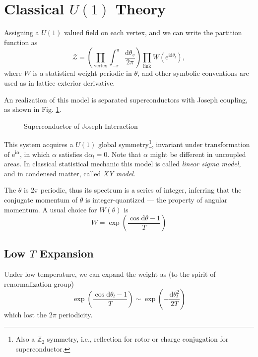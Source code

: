 
\section{Classical $U(1)$ Theory}

Assigning a $U(1)$ valued field on each vertex, and we can write the partition function as
\begin{equation}
  \mathcal{Z} = \left( \prod_{\text{vertex}} \int_{-\pi }^{\pi } \frac{\mathrm{d} \theta_{v}}{2\pi } \right) \prod_{\text{link}} W \left( \mathrm{e}^{\mathrm{i} \mathrm{d}  \theta_{l}} \right),
\end{equation}
where $W$ is a statistical weight periodic in $\theta$, and other symbolic conventions are used as in lattice exterior derivative.

An realization of this model is separated superconductors with Joseph coupling, as shown in Fig. \ref{fig:superconductor-of-joseph-interaction}.
\begin{figure}[ht]
    \centering
    \caption{Superconductor of Joseph Interaction}
    \label{fig:superconductor-of-joseph-interaction}
\end{figure}

This system acquires a $U(1)$ global symmetry\footnote{
  Also a $\mathbb{Z}_2$ symmetry, i.e., reflection for rotor or charge conjugation for superconductor.
}, invariant under transformation of $\mathrm{e}^{\mathrm{i}\alpha}$, in which $\alpha$ satisfies $\mathrm{d} \alpha _{l} = 0$. Note that $\alpha$ might be different in uncoupled areas.
In classical statistical mechanic this model is called \emph{linear sigma model}, and in condensed matter, called \emph{XY model}.

The $\theta$ is $2\pi $ periodic, thus its spectrum is a series of integer, inferring that the conjugate momentum of $\theta$ is integer-quantized --- the property of angular momentum.
A usual choice for $W(\theta)$ is 
\begin{equation}
  W = \exp \left( \frac{\cos \mathrm{d} \theta -1}{T} \right)
\end{equation}

\subsection{Low $T$ Expansion}

Under low temperature, we can expand the weight as (to the spirit of renormalization group)
\begin{equation}
  \exp \left( \frac{\cos  \mathrm{d} \theta_{l} - 1}{T} \right) \sim \exp \left( - \frac{\mathrm{d} \theta_{l}^{2}}{2T} \right) 
\end{equation}
which lost the $2\pi $ periodicity.

